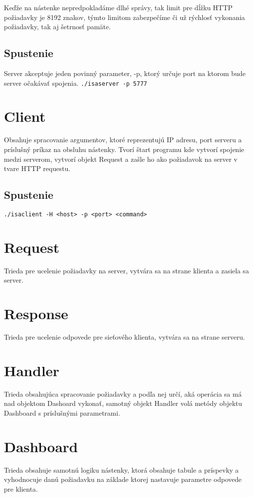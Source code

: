 \documentclass[a4paper,12pt,oneside]{article}
\theoremstyle{definition}
\theoremstyle{definition}
\theoremstyle{definition}
\begin{document}
Keďže na nástenke nepredpokladáme dlhé správy, tak limit pre dĺžku HTTP požiadavky je 8192 znakov, týmto limitom zabezpečíme či už rýchlosť vykonania požiadavky, tak aj šetrnosť pamäte.

\subsection{Spustenie}
Server akceptuje jeden povinný parameter, -p, ktorý určuje port na ktorom bude server očakávať spojenia. \texttt{./isaserver -p 5777}

\section{Client}
Obsahuje spracovanie argumentov, ktoré reprezentujú IP adresu, port serveru a príslušný príkaz na obsluhu nástenky. Tvorí štart programu kde vytvorí spojenie medzi serverom, vytvorí objekt Request a zašle ho ako požiadavok na server v tvare HTTP requestu.

\subsection{Spustenie}
\texttt{./isaclient -H <host> -p <port> <command>}

\section{Request}
Trieda pre ucelenie požiadavky na server, vytvára sa na strane klienta a zasiela sa server.

\section{Response}
Trieda pre ucelenie odpovede pre sieťového klienta, vytvára sa na strane serveru.

\section{Handler}
Trieda obsahujúca spracovanie požiadavky a podľa nej určí, aká operácia sa má nad objektom Dashoard vykonať, samotný objekt Handler volá metódy objektu Dashboard s príslušnými parametrami.

\section{Dashboard}
Trieda obsahuje samotnú logiku nástenky, ktorá obsahuje tabule a príspevky a vyhodnocuje danú požiadavku na základe ktorej nastavuje parametre odpovede pre klienta.
\end{document}
